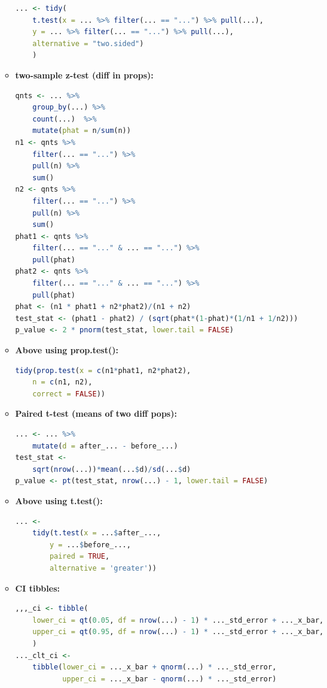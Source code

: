 \documentclass[8pt,landscape,a4paper, fleqn, dvipsnames]{extarticle}
\begin{document}
\begin{multicols*}{4}
\begin{itemize}
\begin{itemize}
\begin{lstlisting}[language = R]
... <- tidy(
    t.test(x = ... %>% filter(... == "...") %>% pull(...), 
    y = ... %>% filter(... == "...") %>% pull(...),
    alternative = "two.sided")
    )
        \end{lstlisting}
    \item \textbf{two-sample z-test (diff in props):}
        \begin{lstlisting}[language = R]
qnts <- ... %>% 
    group_by(...) %>% 
    count(...)  %>% 
    mutate(phat = n/sum(n))
n1 <- qnts %>% 
    filter(... == "...") %>% 
    pull(n) %>% 
    sum()
n2 <- qnts %>% 
    filter(... == "...") %>% 
    pull(n) %>% 
    sum()
phat1 <- qnts %>% 
    filter(... == "..." & ... == "...") %>% 
    pull(phat)
phat2 <- qnts %>% 
    filter(... == "..." & ... == "...") %>%
    pull(phat)
phat <- (n1 * phat1 + n2*phat2)/(n1 + n2)
test_stat <- (phat1 - phat2) / (sqrt(phat*(1-phat)*(1/n1 + 1/n2)))
p_value <- 2 * pnorm(test_stat, lower.tail = FALSE)
        \end{lstlisting}
        \item \textbf{Above using prop.test():}
        \begin{lstlisting}[language = R] 
tidy(prop.test(x = c(n1*phat1, n2*phat2), 
    n = c(n1, n2), 
    correct = FALSE))
        \end{lstlisting}
        \item \textbf{Paired t-test (means of two diff pops):}
        \begin{lstlisting}[language = R]
... <- ... %>% 
    mutate(d = after_... - before_...)
test_stat <- 
    sqrt(nrow(...))*mean(...$d)/sd(...$d)
p_value <- pt(test_stat, nrow(...) - 1, lower.tail = FALSE)
        \end{lstlisting}
        \item \textbf{Above using t.test():}
        \begin{lstlisting}[language = R]
... <- 
    tidy(t.test(x = ...$after_..., 
        y = ...$before_..., 
        paired = TRUE,
        alternative = 'greater'))
        \end{lstlisting}
        \item \textbf{CI tibbles:}
        \begin{lstlisting}[language = R]
,,,_ci <- tibble(
    lower_ci = qt(0.05, df = nrow(...) - 1) * ..._std_error + ..._x_bar,
    upper_ci = qt(0.95, df = nrow(...) - 1) * ..._std_error + ..._x_bar,
    )
..._clt_ci <- 
    tibble(lower_ci = ..._x_bar + qnorm(...) * ..._std_error, 
           upper_ci = ..._x_bar - qnorm(...) * ..._std_error)
        \end{lstlisting}

\end{itemize}
\end{itemize}
\end{multicols*}
\end{document}
